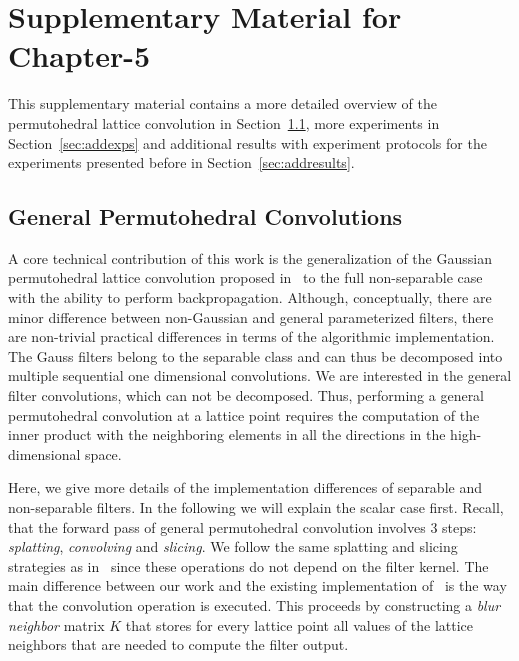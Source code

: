 \chapter{Supplementary Material for Chapter-5}


This supplementary material contains a more detailed overview of the permutohedral
lattice convolution in Section~\ref{sec:permconv}, more experiments in
Section~\ref{sec:addexps} and additional results with experiment protocols for
the experiments presented before in Section~\ref{sec:addresults}.

\section{General Permutohedral Convolutions}
\label{sec:permconv}

A core technical contribution of this work is the generalization of the Gaussian permutohedral lattice
convolution proposed in~\cite{adams2010fast} to the full non-separable case with the
ability to perform backpropagation. Although, conceptually, there are minor
difference between non-Gaussian and general parameterized filters, there are non-trivial practical
differences in terms of the algorithmic implementation. The Gauss filters belong to
the separable class and can thus be decomposed into multiple
sequential one dimensional convolutions. We are interested in the general filter
convolutions, which can not be decomposed. Thus, performing a general permutohedral
convolution at a lattice point requires the computation of the inner product with the
neighboring elements in all the directions in the high-dimensional space.

Here, we give more details of the implementation differences of separable
and non-separable filters. In the following we will explain the scalar case first.
Recall, that the forward pass of general permutohedral convolution
involves 3 steps: \textit{splatting}, \textit{convolving} and \textit{slicing}.
We follow the same splatting and slicing strategies as in~\cite{adams2010fast}
since these operations do not depend on the filter kernel. The main difference
between our work and the existing implementation of~\cite{adams2010fast} is
the way that the convolution operation is executed. This proceeds by constructing
a \emph{blur neighbor} matrix $K$ that stores for every lattice point all
values of the lattice neighbors that are needed to compute the filter output.

